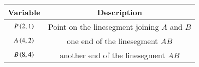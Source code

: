 \begin{tabular}[12pt]{ |c| c|}
    \hline
    \textbf{Variable} & \textbf{Description}\\ 
    \hline
    $P\left(2,1\right)$ & Point on the linesegment joining $A$ and $B$ \\
    \hline 
    $A\left(4,2\right)$ & one end of the linesegment $AB$ \\
    \hline
    $B\left(8,4\right)$ & another end of the linesegment $AB$\\
    \hline 
    \end{tabular}
